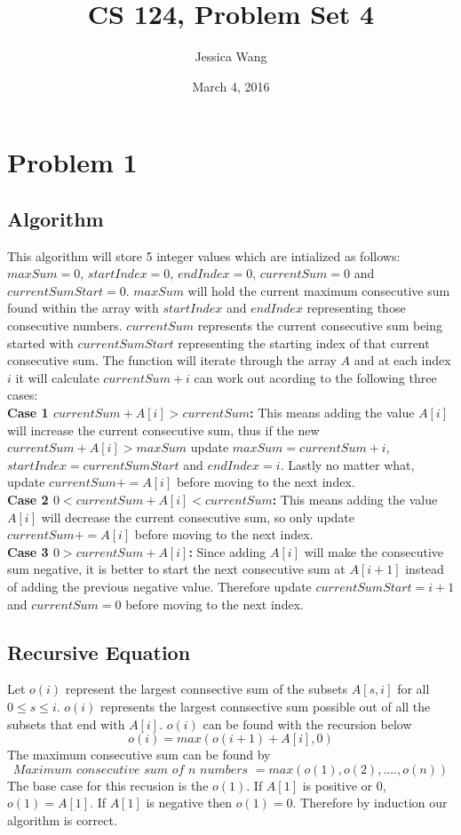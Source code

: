 \documentclass[11pt]{article}
\title{CS 124, Problem Set 4}
\author{Jessica Wang}
\date{March 4, 2016}
\begin{document}
\maketitle
\section*{Problem 1}
\subsection*{Algorithm}
This algorithm will store 5 integer values which are intialized as follows: $maxSum=0$, $startIndex=0$, $endIndex=0$, $currentSum=0$ and $currentSumStart=0$. $maxSum$ will hold the current maximum consecutive sum found within the array with $startIndex$ and $endIndex$ representing those consecutive numbers. $currentSum$ represents the current consecutive sum being started with $currentSumStart$ representing the starting index of that current consecutive sum. The function will iterate through the array $A$ and at each index $i$ it will calculate $currentSum + i$ can work out acording to the following three cases:\\
\textbf{Case 1 $currentSum+ A[i] > currentSum$:} This means adding the value $A[i]$ will increase the current consecutive sum, thus if the new $currentSum + A[i]> maxSum$ update $maxSum = currentSum + i$, $startIndex = currentSumStart$ and $endIndex = i$. Lastly no matter what, update $currentSum += A[i]$ before moving to the next index.\\
\textbf{Case 2 $0 < currentSum+ A[i] < currentSum$:} This means adding the value $A[i]$ will decrease the current consecutive sum, so only update $currentSum += A[i]$ before moving to the next index.\\
\textbf{Case 3 $0 > currentSum+ A[i]$:} Since adding $A[i]$ will make the consecutive sum negative, it is better to start the next consecutive sum at $A[i+1]$ instead of adding the previous negative value. Therefore update $currentSumStart = i+1$ and $currentSum = 0$ before moving to the next index. 

\subsection*{Recursive Equation}
Let $o(i)$ represent the largest connsective sum of the subsets $A[s,i]$ for all $0 \leq s \leq i$. $o(i)$ represents the largest connsective sum possible out of all the subsets that end with $A[i]$. $o(i)$ can be found with the recursion below
\[o(i) = max(o(i+1) + A[i], 0)\]
The maximum consecutive sum can be found by 
\[\textit{Maximum consecutive sum of n numbers }= max(o(1),o(2), ...., o(n))\]
The base case for this recusion is the $o(1)$. If $A[1]$ is positive or 0, $o(1)=A[1]$. If $A[1]$ is negative then $o(1) = 0$. Therefore by induction our algorithm is correct.
\end{document}
